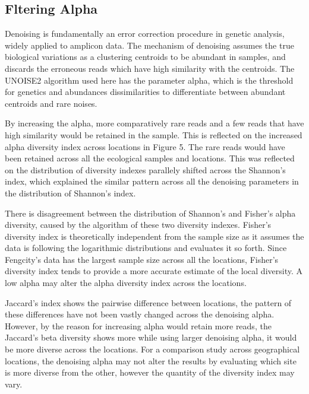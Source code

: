 \documentclass[11pt, a4paper]{article}
\begin{document}
\subsection{Fltering Alpha}
Denoising is fundamentally an error correction procedure in genetic analysis, widely applied to amplicon data. The mechanism of denoising assumes the true biological variations as a clustering centroids to be abundant in samples, and discards the erroneous reads which have high similarity with the centroids. The UNOISE2 algorithm\cite{Edgar2016b} used here has the parameter alpha, which is the threshold for genetics and abundances dissimilarities to differentiate between abundant centroids and rare noises. 

By increasing the alpha, more comparatively rare reads and a few reads that have high similarity would be retained in the sample. This is reflected on the increased alpha diversity index across locations in Figure 5. The rare reads would have been retained across all the ecological samples and locations. This was reflected on the distribution of diversity indexes parallely shifted across the Shannon’s index, which explained the similar pattern across all the denoising parameters in the distribution of Shannon’s index.

There is disagreement between the distribution of Shannon’s and Fisher’s alpha diversity,  caused by the algorithm of these two diversity indexes. Fisher’s diversity index is theoretically independent from the sample size \cite{Karlson2004} as it assumes the data is following the logarithmic distributions and evaluates it so forth. Since Fengcity’s data  has the largest sample size across all the locations, Fisher’s diversity index tends to provide a more accurate estimate of the local diversity. A low alpha may alter the alpha diversity index across the locations.

Jaccard’s index shows the pairwise difference between locations, the pattern of these differences have not been vastly changed across the denoising alpha. However, by the reason for increasing alpha would retain more reads, the Jaccard’s beta diversity shows more while using larger denoising alpha, it would be more diverse across the locations. For a comparison study across geographical locations, the denoising alpha may not alter the results by evaluating which site is more diverse from the other, however the quantity of the diversity index may vary. 
\end{document}
